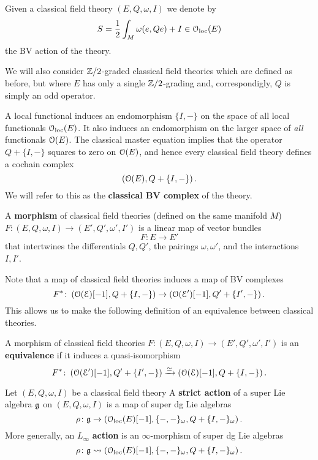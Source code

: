 \documentclass[10pt, oneside]{article}
\begin{document}
Given a classical field theory $(E, Q, \omega, I)$ we denote by
\[S = \frac{1}{2} \int_M \omega(e, Q e) + I\in \mathcal{O}_{\rm loc}(E)\]
the BV action of the theory.

\begin{remark}
We will also consider $\mathbb Z/2$-graded classical field theories which are defined as before, but where $E$ has only a single $\mathbb Z/2$-grading and, correspondigly, $Q$ is simply an odd operator.
\end{remark}

A local functional induces an endomorphism $\{I,-\}$ on the space of all local functionals $\mathcal{O}_{\rm loc}(E)$. 
It also induces an endomorphism on the larger space of {\em all} functionals $\mathcal O(E)$. 
The classical master equation implies that the operator $Q + \{I,-\}$ squares to zero on $\mathcal O(E)$, and hence every classical field theory defines a cochain complex
\[
\left(\mathcal O(E), Q + \{I,-\}\right) .
\]
We will refer to this as the {\bf classical BV complex} of the theory. 

\begin{dfn}
A {\bf morphism} of classical field theories (defined on the same manifold $M$) $F\colon (E, Q, \omega, I) \to (E', Q', \omega', I')$ is a linear map of vector bundles
\[
F\colon E \to E'
\]
that intertwines the differentials $Q, Q'$, the pairings $\omega, \omega'$, and the interactions $I,I'$. 
\end{dfn}

Note that a map of classical field theories induces a map of BV complexes
\[
F^*\colon \left(\mathcal O (\mathcal E)[-1], Q + \{I,-\} \right) \to \left(\mathcal O (\mathcal E')[-1], Q' + \{I',-\} \right) .
\]
This allows us to make the following definition of an equivalence between classical theories. 

\begin{dfn} \label{equivalence_def}
A morphism of classical field theories $F\colon (E, Q, \omega, I) \to (E', Q', \omega', I')$ is an {\bf equivalence} if it induces a quasi-isomorphism 
\[
F^* \colon  \left(\mathcal O(\mathcal E')[-1], Q' + \{I',-\} \right) \xrightarrow{\simeq} \left(\mathcal O(\mathcal E)[-1], Q + \{I,-\} \right) .
\]
\end{dfn}

\begin{dfn}
Let $(E, Q,\omega, I)$ be a classical field theory 
A {\bf strict action} of a super Lie algebra $\mathfrak g$ on $(E, Q,\omega, I)$ is a map of super dg Lie algebras
\[
\rho\colon \mathfrak g \to \left(\mathcal{O}_{\rm loc}(E)[-1] , \{-,-\}_\omega, Q + \{I,-\}_\omega\right) .
\]
More generally, an $L_\infty$ {\bf action} is an $\infty$-morphism of super dg Lie algebras
\[
\rho\colon \mathfrak g \rightsquigarrow \left(\mathcal{O}_{\rm loc}(E)[-1] , \{-,-\}_\omega, Q + \{I,-\}_\omega\right) .
\]
\end{dfn}
\end{document}
